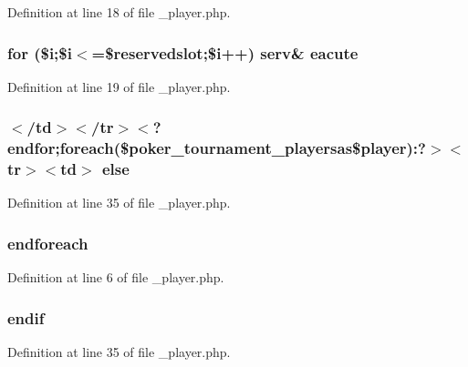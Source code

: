 Definition at line 18 of file \-\_\-player.\-php.

\hypertarget{__player_8php_a96211b6404c1046001c7c062399b9ab2}{
\subsubsection[{eacute}]{\setlength{\rightskip}{0pt plus 5cm}for (\${\bf i};\${\bf i}$<$=\$reservedslot;\${\bf i}++) serv\& eacute}}\label{__player_8php_a96211b6404c1046001c7c062399b9ab2}


Definition at line 19 of file \-\_\-player.\-php.

\hypertarget{__player_8php_a3c57bd1f4e829601d16e37a2a28cb4cc}{
\subsubsection[{else}]{\setlength{\rightskip}{0pt plus 5cm}$<$/td$>$$<$/tr$>$$<$?endfor;{\bf foreach}(\$poker\-\_\-tournament\-\_\-playersas\$player)\-:?$>$$<$tr$>$$<$td$>$ else}}\label{__player_8php_a3c57bd1f4e829601d16e37a2a28cb4cc}


Definition at line 35 of file \-\_\-player.\-php.

\hypertarget{__player_8php_a672d9707ef91db026c210f98cc601123}{
\subsubsection[{endforeach}]{\setlength{\rightskip}{0pt plus 5cm}endforeach}}\label{__player_8php_a672d9707ef91db026c210f98cc601123}


Definition at line 6 of file \-\_\-player.\-php.

\hypertarget{__player_8php_a82cd33ca97ff99f2fcc5e9c81d65251b}{
\subsubsection[{endif}]{\setlength{\rightskip}{0pt plus 5cm}endif}}\label{__player_8php_a82cd33ca97ff99f2fcc5e9c81d65251b}


Definition at line 35 of file \-\_\-player.\-php.

